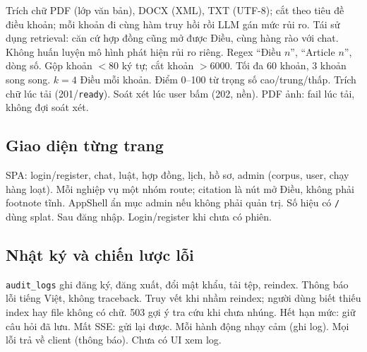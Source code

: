 \boncau
{Trích chữ PDF (lớp văn bản), DOCX (XML), TXT (UTF-8); cắt theo tiêu đề điều
khoản; mỗi khoản đi cùng hàm truy hồi rồi LLM gán mức rủi ro.}
{Tái sử dụng retrieval: căn cứ hợp đồng cũng mở được Điều, cùng hàng rào với chat.
Không huấn luyện mô hình phát hiện rủi ro riêng.}
{Regex ``Điều $n$'', ``Article $n$'', dòng số. Gộp khoản $<80$ ký tự; cắt khoản
$>6000$. Tối đa 60 khoản, 3 khoản song song. $k=4$ Điều mỗi khoản. Điểm 0--100
từ trọng số cao/trung/thấp.}
{Trích chữ lúc tải (201/\texttt{ready}). Soát xét lúc user bấm (202, nền). PDF
ảnh: fail lúc tải, không đợi soát xét.}

\subsection{Giao diện từng trang}

\boncau
{SPA: login/register, chat, luật, hợp đồng, lịch, hồ sơ, admin (corpus, user,
chạy hàng loạt).}
{Mỗi nghiệp vụ một nhóm route; citation là nút mở Điều, không phải footnote tĩnh.}
{AppShell ẩn mục admin nếu không phải quản trị. Số hiệu có \texttt{/} dùng splat.}
{Sau đăng nhập. Login/register khi chưa có phiên.}

\subsection{Nhật ký và chiến lược lỗi}

\boncau
{\texttt{audit\_logs} ghi đăng ký, đăng xuất, đổi mật khẩu, tải tệp, reindex.
Thông báo lỗi tiếng Việt, không traceback.}
{Truy vết khi nhầm reindex; người dùng biết thiếu index hay file không có chữ.}
{503 gợi ý tra cứu khi chưa nhúng. Hết hạn mức: giữ câu hỏi đã lưu. Mất SSE:
gửi lại được.}
{Mỗi hành động nhạy cảm (ghi log). Mọi lỗi trả về client (thông báo). Chưa có
UI xem log.}
